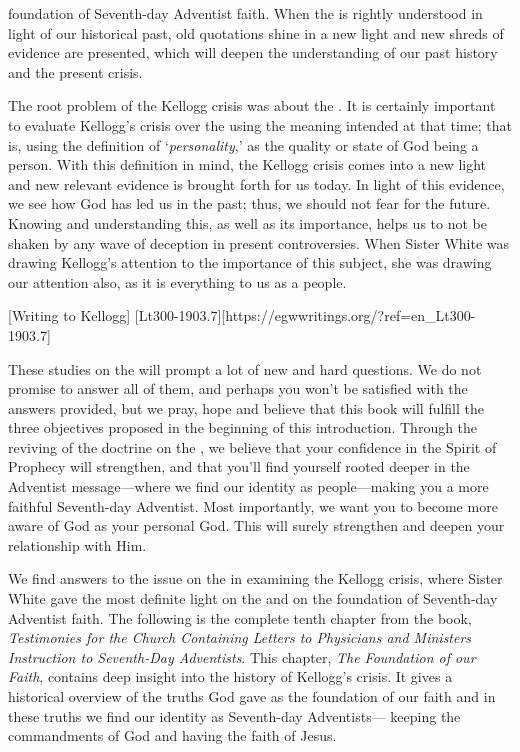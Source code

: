 foundation of Seventh-day Adventist faith. When the  is rightly understood in light of our historical past, old quotations shine in a new light and new shreds of evidence are presented, which will deepen the understanding of our past history and the present crisis.

The root problem of the Kellogg crisis was about the . It is certainly important to evaluate Kellogg's crisis over the  using the meaning intended at that time; that is, using the definition of ‘\textit{personality},’ as the quality or state of God being a person. With this definition in mind, the Kellogg crisis comes into a new light and new relevant evidence is brought forth for us today. In light of this evidence, we see how God has led us in the past; thus, we should not fear for the future. Knowing and understanding this, as well as its importance, helps us to not be shaken by any wave of deception in present controversies. When Sister White was drawing Kellogg’s attention to the importance of this subject, she was drawing our attention also, as it is everything to us as a people.

[Writing to Kellogg] [Lt300-1903.7][https://egwwritings.org/?ref=en\_Lt300-1903.7]

These studies on the  will prompt a lot of new and hard questions. We do not promise to answer all of them, and perhaps you won’t be satisfied with the answers provided, but we pray, hope and believe that this book will fulfill the three objectives proposed in the beginning of this introduction. Through the reviving of the doctrine on the , we believe that your confidence in the Spirit of Prophecy will strengthen, and that you’ll find yourself rooted deeper in the Adventist message—where we find our identity as people—making you a more faithful Seventh-day Adventist. Most importantly, we want you to become more aware of God as your personal God. This will surely strengthen and deepen your relationship with Him. 

We find answers to the issue on the  in examining the Kellogg crisis, where Sister White gave the most definite light on the  and on the foundation of Seventh-day Adventist faith. The following is the complete tenth chapter from the book, \textit{Testimonies for the Church Containing Letters to Physicians and Ministers Instruction to Seventh-Day Adventists}. This chapter, \textit{The Foundation of our Faith}, contains deep insight into the history of Kellogg’s crisis. It gives a historical overview of the truths God gave as the foundation of our faith and in these truths we find our identity as Seventh-day Adventists— keeping the commandments of God and having the faith of Jesus.
